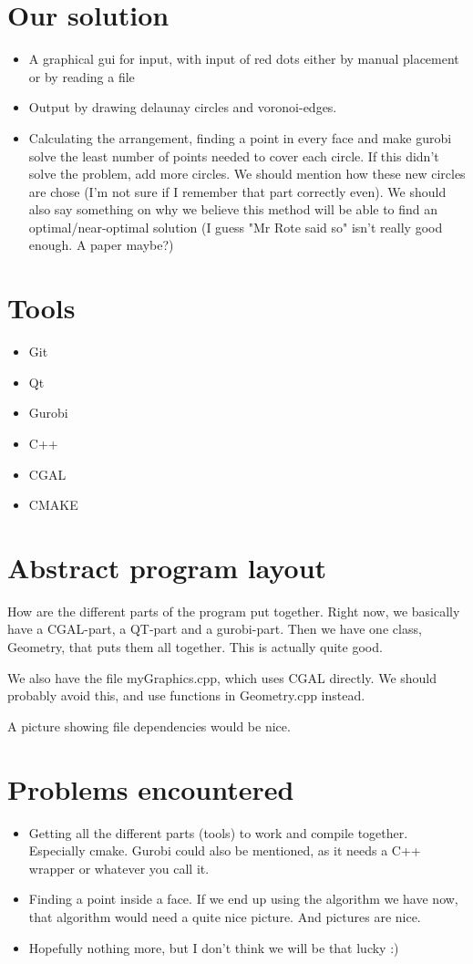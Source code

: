 \documentclass[a4paper,12pt]{article}
\begin{document}
\section{Our solution}
\begin{itemize}
\item
A graphical gui for input, with input of red dots either by manual placement or by reading a file
\item
Output by drawing delaunay circles and voronoi-edges.
\item
Calculating the arrangement, finding a point in every face and make gurobi solve the least number of points needed to cover each circle.
If this didn't solve the problem, add more circles. We should mention how these new circles are chose (I'm not sure if I remember that part correctly even). We should also say something on why we believe this method will be able to find an optimal/near-optimal solution (I guess "Mr Rote said so" isn't really good enough. A paper maybe?)
\end{itemize}
\section{Tools}
\begin{itemize}
\item
Git
\item
Qt
\item
Gurobi
\item
C++
\item
CGAL
\item
CMAKE
\end{itemize}

\section{Abstract program layout}
How are the different parts of the program put together. Right now, we basically have a CGAL-part, a QT-part and a gurobi-part. Then we have one class, Geometry, that puts them all together. This is actually quite good.

We also have the file myGraphics.cpp, which uses CGAL directly. We should probably avoid this, and use functions in Geometry.cpp instead.

A picture showing file dependencies would be nice.

\section{Problems encountered}
\begin{itemize}
\item
Getting all the different parts (tools) to work and compile together. Especially cmake. Gurobi could also be mentioned, as it needs a C++ wrapper or whatever you call it.
\item
Finding a point inside a face. If we end up using the algorithm we have now, that algorithm would need a quite nice picture. And pictures are nice.
\item
Hopefully nothing more, but I don't think we will be that lucky :)
\end{itemize}
\end{document}
